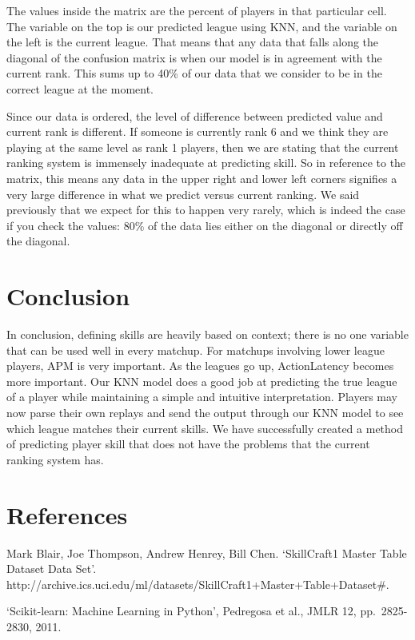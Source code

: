 \documentclass[letterpaper,10pt,english]{/usr/share/sphinx/texinputs/sphinxhowto}
\begin{document}
        
    
The values inside the matrix are the percent of players in that
particular cell. The variable on the top is our predicted league using
KNN, and the variable on the left is the current league. That means that
any data that falls along the diagonal of the confusion matrix is when
our model is in agreement with the current rank. This sums up to 40\% of
our data that we consider to be in the correct league at the moment.

Since our data is ordered, the level of difference between predicted
value and current rank is different. If someone is currently rank 6 and
we think they are playing at the same level as rank 1 players, then we
are stating that the current ranking system is immensely inadequate at
predicting skill. So in reference to the matrix, this means any data in
the upper right and lower left corners signifies a very large difference
in what we predict versus current ranking. We said previously that we
expect for this to happen very rarely, which is indeed the case if you
check the values: 80\% of the data lies either on the diagonal or
directly off the diagonal.\part{Conclusion}In conclusion, defining skills are heavily based on context; there is no
one variable that can be used well in every matchup. For matchups
involving lower league players, APM is very important. As the leagues go
up, ActionLatency becomes more important. Our KNN model does a good job
at predicting the true league of a player while maintaining a simple and
intuitive interpretation. Players may now parse their own replays and
send the output through our KNN model to see which league matches their
current skills. We have successfully created a method of predicting
player skill that does not have the problems that the current ranking
system has.\part{References}Mark Blair, Joe Thompson, Andrew Henrey, Bill Chen. `SkillCraft1 Master
Table Dataset Data Set'.
http://archive.ics.uci.edu/ml/datasets/SkillCraft1+Master+Table+Dataset\#.

`Scikit-learn: Machine Learning in Python', Pedregosa et al., JMLR 12,
pp.~2825-2830, 2011.
        

        \renewcommand{\indexname}{Index}
        \printindex

    
\end{document}
